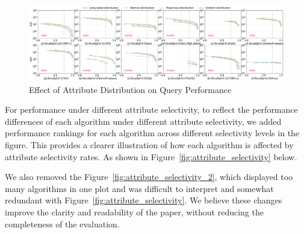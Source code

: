 \documentclass[sigconf, nonacm]{acmart}
\begin{document}
%
%
%


\begin{figure}[t]  %
	\centering
	\includegraphics[width=\linewidth]{fig/exp_3_1.pdf}
	\caption{Effect of Attribute Distribution on Query Performance}
	\label{fig:attribute_distribution}
\end{figure}

For performance under different attribute selectivity, to reflect the performance differences of each algorithm under different attribute selectivity, we added performance rankings for each algorithm across different selectivity levels in the figure. This provides a clearer illustration of how each algorithm is affected by attribute selectivity rates. As shown in Figure~\ref{fig:attribute_selectivity} below.

We also removed the  Figure~\ref{fig:attribute_selectivity_2}, which displayed too many algorithms in one plot and was difficult to interpret and somewhat redundant with Figure~\ref{fig:attribute_selectivity}. We believe these changes improve the clarity and readability of the paper, without reducing the completeness of the evaluation.
\end{document}
